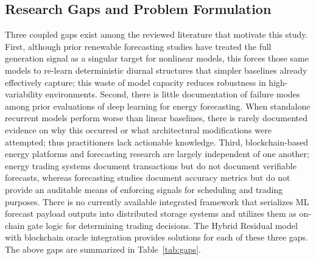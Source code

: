 \documentclass{ieeeaccess}
\begin{document}
\subsection{Research Gaps and Problem Formulation}
Three coupled gaps exist among the reviewed literature that motivate this study. First, although prior renewable forecasting studies have treated the full generation signal as a singular target for nonlinear models, this forces those same models to re-learn deterministic diurnal structures that simpler baselines already effectively capture; this waste of model capacity reduces robustness in high-variability environments. Second, there is little documentation of failure modes among prior evaluations of deep learning for energy forecasting. When standalone recurrent models perform worse than linear baselines, there is rarely documented evidence on why this occurred or what architectural modifications were attempted; thus practitioners lack actionable knowledge. Third, blockchain-based energy platforms and forecasting research are largely independent of one another; energy trading systems document transactions but do not document verifiable forecasts, whereas forecasting studies document accuracy metrics but do not provide an auditable means of enforcing signals for scheduling and trading purposes. There is no currently available integrated framework that serializes ML forecast payload outputs into distributed storage systems and utilizes them as on-chain gate logic for determining trading decisions. The Hybrid Residual model with blockchain oracle integration provides solutions for each of these three gaps. The above gaps are summarized in Table~\ref{tab:gaps}.
\end{document}
